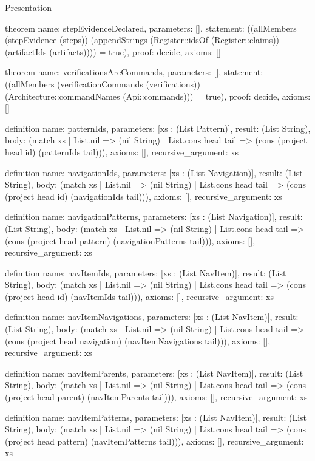 \begin{lexlean}{Presentation}
\begin{semanticmodule}
theorem{
  name: stepEvidenceDeclared,
  parameters: [],
  statement: ((allMembers (stepEvidence (steps)) (appendStrings (Register::idsOf (Register::claims)) (artifactIds (artifacts)))) = true),
  proof: decide{},
  axioms: []
}

theorem{
  name: verificationsAreCommands,
  parameters: [],
  statement: ((allMembers (verificationCommands (verifications)) (Architecture::commandNames (Api::commands))) = true),
  proof: decide{},
  axioms: []
}

definition{
  name: patternIds,
  parameters: [xs : (List Pattern)],
  result: (List String),
  body: (match xs
    | List.nil => (nil String)
    | List.cons head tail => (cons (project head id) (patternIds tail))),
  axioms: [],
  recursive_argument: xs
}

definition{
  name: navigationIds,
  parameters: [xs : (List Navigation)],
  result: (List String),
  body: (match xs
    | List.nil => (nil String)
    | List.cons head tail => (cons (project head id) (navigationIds tail))),
  axioms: [],
  recursive_argument: xs
}

definition{
  name: navigationPatterns,
  parameters: [xs : (List Navigation)],
  result: (List String),
  body: (match xs
    | List.nil => (nil String)
    | List.cons head tail => (cons (project head pattern) (navigationPatterns tail))),
  axioms: [],
  recursive_argument: xs
}

definition{
  name: navItemIds,
  parameters: [xs : (List NavItem)],
  result: (List String),
  body: (match xs
    | List.nil => (nil String)
    | List.cons head tail => (cons (project head id) (navItemIds tail))),
  axioms: [],
  recursive_argument: xs
}

definition{
  name: navItemNavigations,
  parameters: [xs : (List NavItem)],
  result: (List String),
  body: (match xs
    | List.nil => (nil String)
    | List.cons head tail => (cons (project head navigation) (navItemNavigations tail))),
  axioms: [],
  recursive_argument: xs
}

definition{
  name: navItemParents,
  parameters: [xs : (List NavItem)],
  result: (List String),
  body: (match xs
    | List.nil => (nil String)
    | List.cons head tail => (cons (project head parent) (navItemParents tail))),
  axioms: [],
  recursive_argument: xs
}

definition{
  name: navItemPatterns,
  parameters: [xs : (List NavItem)],
  result: (List String),
  body: (match xs
    | List.nil => (nil String)
    | List.cons head tail => (cons (project head pattern) (navItemPatterns tail))),
  axioms: [],
  recursive_argument: xs
}


\end{semanticmodule}
\end{lexlean}
